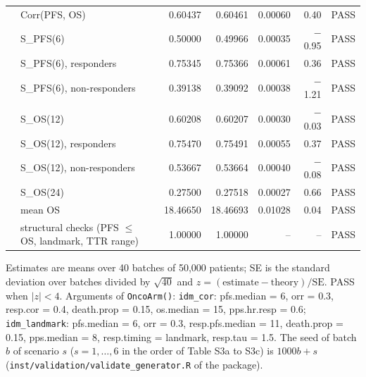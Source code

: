 \begin{table}[htbp]
\begin{threeparttable}
\begin{tabular}{p{2.4cm}p{4.2cm}rrrrl}
 & Corr(PFS, OS) & 0.60437 & 0.60461 & 0.00060 & 0.40 & PASS \\
 & S\_PFS(6) & 0.50000 & 0.49966 & 0.00035 & $-$0.95 & PASS \\
 & S\_PFS(6), responders & 0.75345 & 0.75366 & 0.00061 & 0.36 & PASS \\
 & S\_PFS(6), non-responders & 0.39138 & 0.39092 & 0.00038 & $-$1.21 & PASS \\
 & S\_OS(12) & 0.60208 & 0.60207 & 0.00030 & $-$0.03 & PASS \\
 & S\_OS(12), responders & 0.75470 & 0.75491 & 0.00055 & 0.37 & PASS \\
 & S\_OS(12), non-responders & 0.53667 & 0.53664 & 0.00040 & $-$0.08 & PASS \\
 & S\_OS(24) & 0.27500 & 0.27518 & 0.00027 & 0.66 & PASS \\
 & mean OS & 18.46650 & 18.46693 & 0.01028 & 0.04 & PASS \\
 & structural checks (PFS $\le$ OS, landmark, TTR range) & 1.00000 & 1.00000 & -- & -- & PASS \\
\bottomrule
\end{tabular}
\begin{tablenotes}
\footnotesize
\item Estimates are means over 40 batches of 50,000 patients; SE is the standard deviation over batches divided by $\sqrt{40}$ and $z = (\mathrm{estimate} - \mathrm{theory}) / \mathrm{SE}$. PASS when $|z| < 4$. Arguments of \texttt{OncoArm()}: \texttt{idm\_cor}: pfs.median = 6, orr = 0.3, resp.cor = 0.4, death.prop = 0.15, os.median = 15, pps.hr.resp = 0.6; \texttt{idm\_landmark}: pfs.median = 6, orr = 0.3, resp.pfs.median = 11, death.prop = 0.15, pps.median = 8, resp.timing = landmark, resp.tau = 1.5. The seed of batch $b$ of scenario $s$ ($s = 1, \ldots, 6$ in the order of Table S3a to S3c) is $1000 b + s$ (\texttt{inst/validation/validate\_generator.R} of the package).
\end{tablenotes}
\end{threeparttable}
\end{table}
